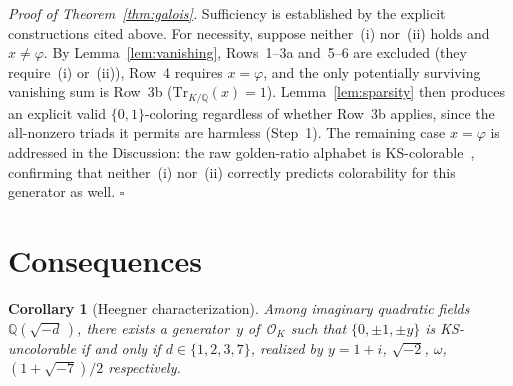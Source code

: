 \documentclass[12pt,a4paper]{article}
\newtheorem{corollary}{Corollary}
\newcommand{\Q}{\mathbb{Q}}
\newcommand{\Tr}[1]{\mathrm{Tr}_{K/\Q}\!\left(#1\right)}
\begin{document}
\noindent\textit{Proof of Theorem~\ref{thm:galois}.}
Sufficiency is established by the explicit constructions cited above.
For necessity, suppose neither~(i) nor~(ii) holds and $x \neq \varphi$.
By Lemma~\ref{lem:vanishing}, Rows~1--3a and~5--6 are excluded
(they require~(i) or~(ii)), Row~4 requires $x = \varphi$, and the
only potentially surviving vanishing sum is Row~3b ($\Tr{x} = 1$).
Lemma~\ref{lem:sparsity} then produces an explicit valid
$\{0,1\}$-coloring regardless of whether Row~3b applies, since
the all-nonzero triads it permits are harmless (Step~1).
The remaining case $x = \varphi$ is
addressed in the Discussion: the raw golden-ratio alphabet
is KS-colorable~\cite{Kernaghan2026islands}, confirming that
neither~(i) nor~(ii) correctly predicts colorability for this
generator as well.
\hfill$\square$

\section{Consequences}\label{sec:consequences}

\begin{corollary}[Heegner characterization]\label{cor:heegner}
Among imaginary quadratic fields $\Q(\sqrt{-d}\,)$, there exists
a generator~$y$ of~$\mathcal{O}_K$ such that
$\{0, \pm 1, \pm y\}$ is KS-uncolorable if and only if
$d \in \{1, 2, 3, 7\}$, realized by $y = 1{+}i$,\;
$\sqrt{-2}$,\; $\omega$,\; $(1{+}\sqrt{-7})/2$
respectively.
\end{corollary}
\end{document}
